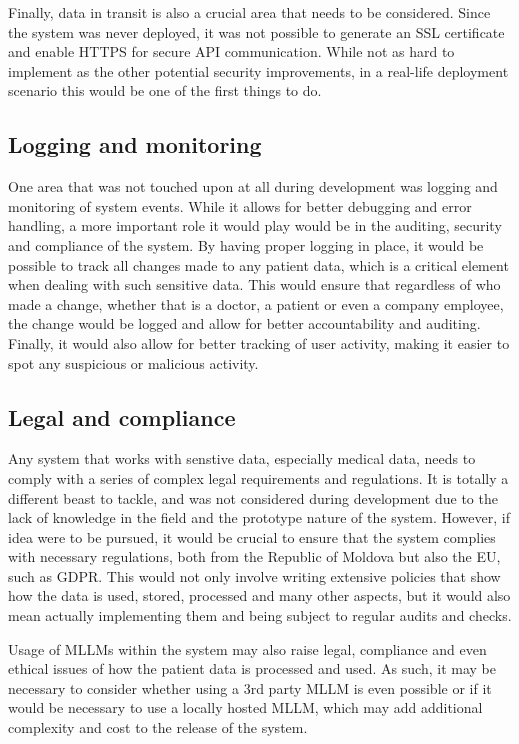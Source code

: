 Finally, data in transit is also a crucial area that needs to be considered. Since the system was never deployed, it was not possible to generate an SSL certificate and enable HTTPS for secure API communication. While not as hard to implement as the other potential security improvements, in a real-life deployment scenario this would be one of the first things to do.

\subsection{Logging and monitoring}

One area that was not touched upon at all during development was logging and monitoring of system events. While it allows for better debugging and error handling, a more important role it would play would be in the auditing, security and compliance of the system. By having proper logging in place, it would be possible to track all changes made to any patient data, which is a critical element when dealing with such sensitive data. This would ensure that regardless of who made a change, whether that is a doctor, a patient or even a company employee, the change would be logged and allow for better accountability and auditing. Finally, it would also allow for better tracking of user activity, making it easier to spot any suspicious or malicious activity.

\subsection{Legal and compliance}

Any system that works with senstive data, especially medical data, needs to comply with a series of complex legal requirements and regulations. It is totally a different beast to tackle, and was not considered during development due to the lack of knowledge in the field and the prototype nature of the system. However, if idea were to be pursued, it would be crucial to ensure that the system complies with necessary regulations, both from the Republic of Moldova but also the EU, such as GDPR\@. This would not only involve writing extensive policies that show how the data is used, stored, processed and many other aspects, but it would also mean actually implementing them and being subject to regular audits and checks. 

Usage of MLLMs within the system may also raise legal, compliance and even ethical issues of how the patient data is processed and used. As such, it may be necessary to consider whether using a 3rd party MLLM is even possible or if it would be necessary to use a locally hosted MLLM, which may add additional complexity and cost to the release of the system.

